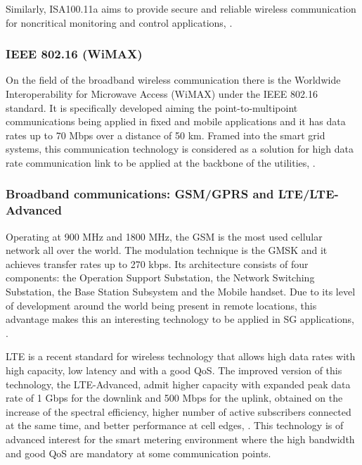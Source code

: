 Similarly, ISA100.11a aims to provide secure and reliable wireless communication for noncritical monitoring and control applications, \cite{Petersen2011}.





\subsubsection{IEEE 802.16 (WiMAX)}

On the field of the broadband wireless communication there is the Worldwide Interoperability for Microwave Access (WiMAX) under the IEEE 802.16 standard. It is specifically developed aiming the point-to-multipoint communications being applied in fixed and mobile applications and it has data rates up to 70 Mbps over a distance of 50 km. Framed into the smart grid systems, this communication technology is considered as a solution for high data rate communication link to be applied at the backbone of the utilities, \cite{Usman2013}.


\subsubsection{Broadband communications: GSM/GPRS and LTE/LTE-Advanced}

Operating at 900 MHz and 1800 MHz, the \ac{GSM} is the most used cellular network all over the world. The modulation technique is the \ac{GMSK} and it achieves transfer rates up to 270 kbps. Its architecture consists of four components: the Operation Support Substation, the Network Switching Substation, the Base Station Subsystem and the Mobile handset. Due to its level of development around the world being present in remote locations, this advantage makes this an interesting technology to be applied in \ac{SG} applications, \cite{Usman2013}.

\ac{LTE} is a recent standard for wireless technology that allows high data rates with high capacity, low latency and with a good \ac{QoS}. The improved version of this technology, the LTE-Advanced, admit higher capacity with expanded peak data rate of 1 Gbps for the downlink and 500 Mbps for the uplink, obtained on the increase of the spectral efficiency, higher  number of active subscribers connected at the same time, and better performance at cell edges, \cite{Mohassel2014}. This technology is of advanced interest for the smart metering environment where the high bandwidth and good \ac{QoS} are mandatory at some communication points.


